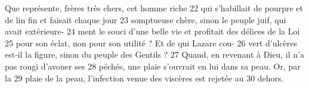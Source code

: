 Que représente, frères très chers, cet homme riche	 
22	 	qui s'habillait de pourpre et de lin fin et faisait chaque jour	 
23	 	somptueuse chère, sinon le peuple juif, qui avait extérieure-	 
24	 	ment le souci d'une belle vie et profitait des délices de la Loi	 
25	 	pour son éclat, non pour son utilité ? Et de qui Lazare cou-	 
26	 	vert d'ulcères est-il la figure, sinon du peuple des Gentils ?	 
27	 	Quand, en revenant à Dieu, il n'a pas rougi d'avouer ses	 
28	 	péchés, une plaie s'ouvrait en lui dans sa peau. Or, par la	 
29	 	plaie de la peau, l'infection venue des viscères est rejetée au	 
30	 	dehors.